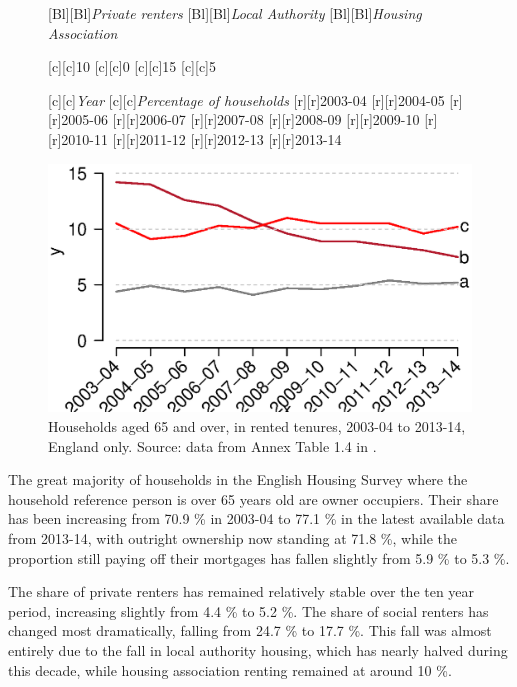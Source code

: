 \documentclass[11 pt, a4paper]{report}
\begin{document}
%

\begin{figure}[hbtp!]
[Bl][Bl]{\emph{Private renters}}
[Bl][Bl]{\emph{Local Authority}}
[Bl][Bl]{\emph{Housing Association}}

[c][c]{\small{10}}
[c][c]{\small{0}}
[c][c]{\small{15}}
[c][c]{\small{5}}

[c][c]{\small{\emph{Year}}}
[c][c]{\small{\emph{Percentage of households}}}
[r][r]{\small{2003-04}}
[r][r]{\small{2004-05}}
[r][r]{\small{2005-06}}
[r][r]{\small{2006-07}}
[r][r]{\small{2007-08}}
[r][r]{\small{2008-09}}
[r][r]{\small{2009-10}}
[r][r]{\small{2010-11}}
[r][r]{\small{2011-12}}
[r][r]{\small{2012-13}}
[r][r]{\small{2013-14}}

\includegraphics[width=\textwidth]{../figures/Fig6.2.eps}
\caption{Households aged 65 and over, in rented tenures, 2003-04 to 2013-14, England only. Source: data from Annex Table 1.4 in  \citet{DCLG2015}.}\label{Fig:17} %
\end{figure}

The great majority of households in the English Housing Survey where the household reference person is over 65 years old are owner occupiers. Their share has been increasing from 70.9 \% in 2003-04 to 77.1 \% in the latest available data from 2013-14, with outright ownership now standing at 71.8 \%, while the proportion still paying off their mortgages has fallen slightly from 5.9 \% to 5.3 \%. 

The share of private renters has remained relatively stable over the ten year period, increasing slightly from 4.4 \% to 5.2 \%.  The share of social renters has changed most dramatically, falling from 24.7 \% to 17.7 \%. This fall was almost entirely due to the fall in local authority housing, which has nearly halved during this decade, while housing association renting remained at around 10 \%. 
\end{document}
